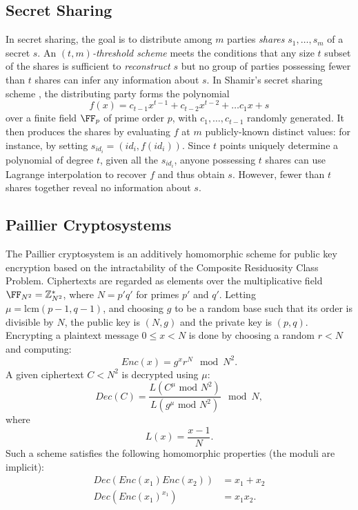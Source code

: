 \subsection{Secret Sharing}

In secret sharing, the goal is to distribute among $m$ parties \emph{shares
}$s_{1},\ldots,s_{m}$ of a secret $s$. An \emph{$(t,m)$-threshold
scheme} meets the conditions that any size $t$ subset of the shares is sufficient to \emph{reconstruct
}$s$ but no group of parties possessing fewer than $t$ shares can
infer any information about $s$. In Shamir's secret sharing scheme
\cite{Shamir}, the distributing party forms the polynomial 
\[
f(x)=c_{t-1}x^{t-1}+c_{t-2}x^{t-2}+\ldots c_{1}x+s
\]
over a finite field $\FF_p$ of prime order $p$, with $c_{1},\ldots, c_{t-1}$ randomly
generated. It then produces the shares by evaluating $f$ at $m$
publicly-known distinct values: for instance, by setting $s_{id_i}=(id_i,f(id_i))$.
Since $t$ points uniquely determine a polynomial of degree $t$,
given all the $s_{id_i}$, anyone possessing $t$ shares can use Lagrange
interpolation to recover $f$ and thus obtain $s$. However, fewer
than $t$ shares together reveal no information about $s$.

\subsection{Paillier Cryptosystems}

The Paillier cryptosystem \cite{Paillier} is an additively homomorphic
scheme for public key encryption based on the intractability of the
Composite Residuosity Class Problem. Ciphertexts are regarded as elements
over the multiplicative field $\FF_{N^2} = \mathbb{Z}_{N^{2}}^{*}$, where $N=p'q'$
for primes $p'$ and $q'$. Letting $\mu=\text{lcm}(p-1,q-1)$,
and choosing $g$ to be a random base such that its order is divisible
by $N$, the public key is $(N,g)$ and the private key is $(p,q)$.
Encrypting a plaintext message $0\leq x<N$ is done by choosing a random
$r<N$ and computing: 
\[
Enc(x)=g^{x}r^{N}\mod N^{2}.
\]
A given ciphertext $C<N^{2}$ is decrypted using $\mu$: 
\[
Dec(C)=\frac{L(C^{\mu}\text{ mod }N^{2})}{L(g^{\mu}\text{ mod }N^{2})}\mod N,
\]
where 
\[
L(x)=\frac{x-1}{N}.
\]
Such a scheme satisfies the following homomorphic properties (the
moduli are implicit): 
\begin{align*}
Dec(Enc(x_{1})Enc(x_{2})) & =x_{1}+x_{2}\\
Dec(Enc(x_{1})^{x_{1}}) & =x_{1}x_{2}.
\end{align*}

